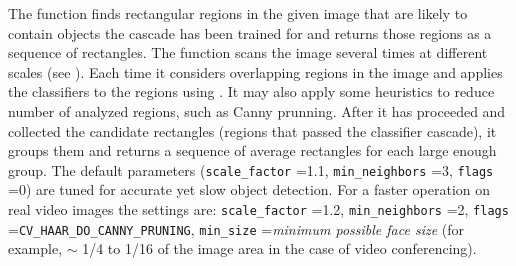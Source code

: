 The function finds rectangular regions in the given image that are likely to contain objects the cascade has been trained for and returns those regions as a sequence of rectangles. The function scans the image several times at different scales (see ). Each time it considers overlapping regions in the image and applies the classifiers to the regions using . It may also apply some heuristics to reduce number of analyzed regions, such as Canny prunning. After it has proceeded and collected the candidate rectangles (regions that passed the classifier cascade), it groups them and returns a sequence of average rectangles for each large enough group. The default parameters (\texttt{scale\_factor} =1.1, \texttt{min\_neighbors} =3, \texttt{flags} =0) are tuned for accurate yet slow object detection. For a faster operation on real video images the settings are: \texttt{scale\_factor} =1.2, \texttt{min\_neighbors} =2, \texttt{flags} =\texttt{CV\_HAAR\_DO\_CANNY\_PRUNING}, \texttt{min\_size} =\textit{minimum possible face size} (for example, $\sim$ 1/4 to 1/16 of the image area in the case of video conferencing).

